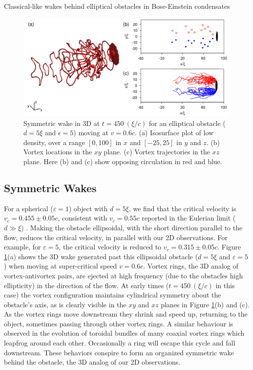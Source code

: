 \begin{chapter}{\label{cha:wake}Classical-like wakes behind elliptical obstacles in Bose-Einstein condensates}
\begin{figure}
\centering
\includegraphics[width=\textwidth]{wake/figure7}
\caption{\label{fig:3d1} Symmetric wake in 3D at $t=450~(\xi/c)$ for an elliptical obstacle ($d=5\xi$ and $\epsilon=5$) moving at $v=0.6c$.  (a) Isosurface plot of low density, over a range $[0,100]$ in $x$ and $[-25,25]$ in $y$ and $z$. (b) Vortex locations in the $xy$ plane.  (c) Vortex trajectories in the $xz$ plane.  Here (b) and (c) show opposing circulation in red and blue.}
\end{figure}
\subsection{Symmetric Wakes} 
For a spherical ($\varepsilon=1$) object with $d=5\xi$, we find that the critical velocity is $v_c=0.455\pm 0.05 c$, consistent with $v_c=0.55c$ reported in the Eulerian limit ($d \gg \xi$) \cite{win01,winiecki99}.  Making the obstacle ellipsoidal, with the short direction parallel to the flow, reduces the critical velocity, in parallel with our 2D observations.  For example, for $\varepsilon=5$, the critical velocity is reduced to $v_c=0.315 \pm 0.05c$.  Figure \ref{fig:3d1}(a) shows the 3D wake generated past this ellipsoidal obstacle ($d=5\xi$ and $\varepsilon = 5$) when moving at super-critical speed $v=0.6c$.  Vortex rings, the 3D analog of vortex-antivortex pairs, are ejected at high frequency (due to the obstacles high ellipticity) in the direction of the flow.  At early times ($t=450~(\xi/c)$ in this case) the vortex configuration maintains cylindrical symmetry about the obstacle's axis, as is clearly visible in the $xy$ and $xz$ planes in Figure \ref{fig:3d1}(b) and (c).  As the vortex rings move downstream they shrink and speed up, returning to the object, sometimes passing through other vortex rings. A similar behaviour is observed \cite{wacks} in the evolution of toroidal bundles of many coaxial vortex rings which leapfrog around each other.  Occasionally a ring will escape this cycle and fall downstream.  These behaviors conspire to form an organized symmetric wake behind the obstacle,  the 3D analog of our 2D observations.  



\end{chapter}
